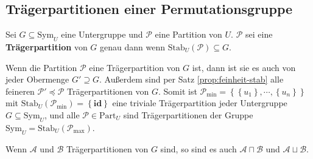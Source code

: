 \subsection{Trägerpartitionen einer Permutationsgruppe}
\begin{defn}
\label{def:traeger}Sei $G\subseteq\mathrm{\mathrm{Sym}}_{U}$ eine
Untergruppe und $\mathcal{P}$ eine Partition von $U$. $\mathcal{P}$
sei eine \textbf{Trägerpartition} von\textbf{ }$G$ genau dann wenn
$\mathrm{Stab}_{U}\left(\mathcal{P}\right)\subseteq G$.
\end{defn}
Wenn die Partition $\mathcal{P}$ eine Trägerpartition von $G$ ist,
dann ist sie es auch von jeder Obermenge $G'\supseteq G$. Außerdem
sind per Satz \ref{prop:feinheit-stab} alle feineren $\mathcal{P}'\preceq\mathcal{P}$
Trägerpartitionen von $G$. Somit ist $\mathcal{P}_{\min}=\left\{ \left\{ u_{1}\right\} ,\cdots,\left\{ u_{n}\right\} \right\} $
mit $\mathrm{Stab}_{U}\left(\mathcal{P}_{\min}\right)=\left\{ \mathbf{id}\right\} $
eine triviale Trägerpartition jeder Untergruppe $G\subseteq\mathrm{Sym}_{U}$,
und alle $\mathcal{P}\in\mathrm{Part}_{U}$ sind Trägerpartitionen
der Gruppe $\mathrm{Sym}_{U}=\mathrm{Stab}_{U}\left(\mathcal{P}_{\max}\right)$.
\begin{prop}
\label{prop:traeger-abschluss}Wenn $\mathcal{A}$ und $\mathcal{B}$
Trägerpartitionen von $G$ sind, so sind es auch $\mathcal{A}\sqcap\mathcal{B}$
und $\mathcal{A}\sqcup\mathcal{B}$.
\end{prop}
